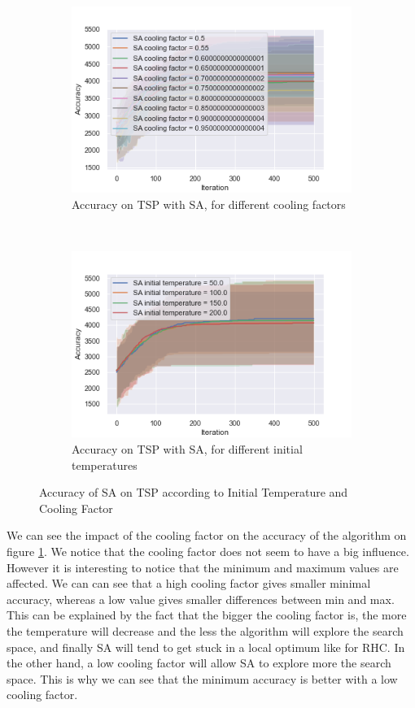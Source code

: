 \documentclass[twocolumn, 10pt]{article}
\begin{document}
				\begin{figure}[h]
					\centering
					\begin{subfigure}[t]{\columnwidth}
						\centering
						\includegraphics[width=0.68\linewidth]{../graphics/tsp_SA_Iteration_Error_SA_cooling_factor.png}
						\caption{Accuracy on TSP with SA, for different cooling factors}
						\label{tsp:sa_cooling}
					\end{subfigure}
					~
					\begin{subfigure}[t]{\columnwidth}
						\centering
						\includegraphics[width=0.68\linewidth]{../graphics/tsp_SA_Iteration_Error_SA_initial_temperature.png}
						\caption{Accuracy on TSP with SA, for different initial temperatures}
						\label{tsp:sa_initial_temp}
					\end{subfigure}
					\caption{Accuracy of SA on TSP according to Initial Temperature and Cooling Factor}
					\label{tsp:sa}
				\end{figure}

				We can see the impact of the cooling factor on the accuracy of the algorithm on figure \ref{tsp:sa_cooling}. We notice that the cooling factor does not seem to have a big influence. However it is interesting to notice that the minimum and maximum values are affected. We can can see that a high cooling factor gives smaller minimal accuracy, whereas a low value gives smaller differences between min and max. This can be explained by the fact that the bigger the cooling factor is, the more the temperature will decrease and the less the algorithm will explore the search space, and finally SA will tend to get stuck in a local optimum like for RHC. In the other hand, a low cooling factor will allow SA to explore more the search space. This is why we can see that the minimum accuracy is better with a low cooling factor.
\end{document}
